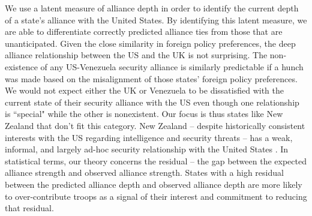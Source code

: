 \documentclass[12pt,letterpaper]{article}
\begin{document}
		We use a latent measure of alliance depth in order to identify the current depth of a state's alliance with the United States. By identifying this latent measure, we are able to differentiate correctly predicted alliance ties from those that are unanticipated. Given the close similarity in foreign policy preferences, the deep alliance relationship between the US and the UK is not surprising. The non-existence of any US-Venezuela security alliance is similarly predictable if a hunch was made based on the misalignment of those states' foreign policy preferences. We would not expect either the UK or Venezuela to be dissatisfied with the current state of their security alliance with the US even though one relationship is ``special" while the other is nonexistent. Our focus is thus states like New Zealand that don't fit this category. New Zealand -- despite historically consistent interests with the US regarding intelligence and security threats -- has a weak, informal, and largely ad-hoc security relationship with the United States \citep{fruhling_anzusreallyalliance_2018}. In statistical terms, our theory concerns the residual -- the gap between the expected alliance strength and observed alliance strength. States with a high residual between the predicted alliance depth and observed alliance depth are more likely to over-contribute troops as a signal of their interest and commitment to reducing that residual.
		
\end{document}
